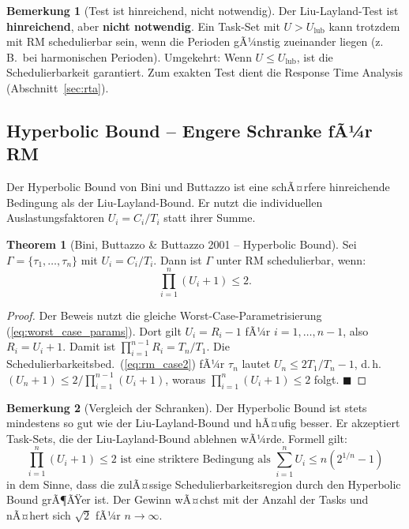 ﻿\documentclass[a4paper,12pt]{report}
\theoremstyle{definition}
\newtheorem{bemerkung}{Bemerkung}[chapter]
\newtheorem{theorem}{Theorem}[chapter]
\begin{document}
\begin{bemerkung}[Test ist hinreichend, nicht notwendig]
	Der Liu-Layland-Test ist \textbf{hinreichend}, aber \textbf{nicht notwendig}.
	Ein Task-Set mit $U > U_{\text{lub}}$ kann trotzdem mit RM schedulierbar sein,
	wenn die Perioden gÃ¼nstig zueinander liegen (z.\,B.\ bei harmonischen Perioden).
	Umgekehrt: Wenn $U \leq U_{\text{lub}}$, ist die Schedulierbarkeit garantiert.
	Zum exakten Test dient die Response Time Analysis (Abschnitt~\ref{sec:rta}).
\end{bemerkung}

\subsection{Hyperbolic Bound -- Engere Schranke fÃ¼r RM}

Der Hyperbolic Bound von Bini und Buttazzo \cite{Bini2001} ist eine schÃ¤rfere
hinreichende Bedingung als der Liu-Layland-Bound. Er nutzt die individuellen
Auslastungsfaktoren $U_i = C_i/T_i$ statt ihrer Summe.

\begin{theorem}[Bini, Buttazzo \& Buttazzo 2001 -- Hyperbolic Bound]
	\label{thm:hyperbolic}
	Sei $\Gamma = \{\tau_1, \ldots, \tau_n\}$ mit $U_i = C_i/T_i$. Dann ist
	$\Gamma$ unter RM schedulierbar, wenn:
	\[
		\prod_{i=1}^{n} (U_i + 1) \leq 2.
	\]
\end{theorem}

\begin{proof}
	Der Beweis nutzt die gleiche Worst-Case-Parametrisierung (\ref{eq:worst_case_params}).
	Dort gilt $U_i = R_i - 1$ fÃ¼r $i = 1,\ldots,n-1$, also $R_i = U_i + 1$. Damit ist
	$\prod_{i=1}^{n-1} R_i = T_n/T_1$. Die Schedulierbarkeitsbed.~(\ref{eq:rm_case2})
	fÃ¼r $\tau_n$ lautet $U_n \leq 2T_1/T_n - 1$, d.\,h.\ $(U_n+1) \leq 2 / \prod_{i=1}^{n-1}(U_i+1)$,
	woraus $\prod_{i=1}^{n}(U_i+1) \leq 2$ folgt. \hfill$\blacksquare$
\end{proof}

\begin{bemerkung}[Vergleich der Schranken]
	Der Hyperbolic Bound ist stets mindestens so gut wie der Liu-Layland-Bound und
	hÃ¤ufig besser. Er akzeptiert Task-Sets, die der Liu-Layland-Bound ablehnen wÃ¼rde.
	Formell gilt:
	\[
		\prod_{i=1}^{n}(U_i + 1) \leq 2 \text{ ist eine striktere Bedingung als } \sum_{i=1}^n U_i \leq n(2^{1/n}-1)
	\]
	in dem Sinne, dass die zulÃ¤ssige Schedulierbarkeitsregion durch den Hyperbolic
	Bound grÃ¶ÃŸer ist. Der Gewinn wÃ¤chst mit der Anzahl der Tasks und nÃ¤hert sich
	$\sqrt{2}$ fÃ¼r $n \to \infty$.
\end{bemerkung}
\end{document}
